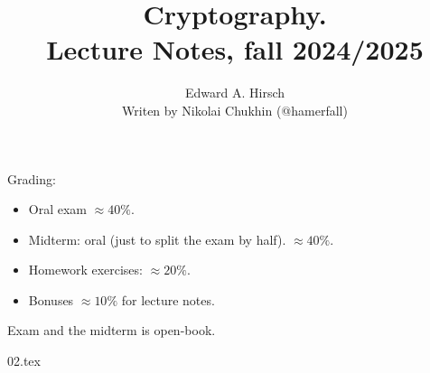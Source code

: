 \documentclass[a4paper,14pt]{extarticle}
\theoremstyle{definition}
\theoremstyle{remark}
\numberwithin{equation}{section} %
\numberwithin{figure}{section} %
\numberwithin{table}{section} %
\begin{document}
    \title{Cryptography. \\ Lecture Notes, fall 2024/2025}
    \author{Edward A. Hirsch \\ Writen by Nikolai Chukhin (@hamerfall)}
    \date{}
    \maketitle
    \newpage

    \tableofcontents
    \newpage

    Grading:
    \begin{itemize}
        \item Oral exam $\approx 40\%$.
        \item Midterm: oral (just to split the exam by half). $\approx 40\%$.
        \item Homework exercises: $\approx 20\%$.
        \item Bonuses $\approx 10\%$ for lecture notes.
    \end{itemize}
    Exam and the midterm is open-book.

    {02.tex}
\end{document}
